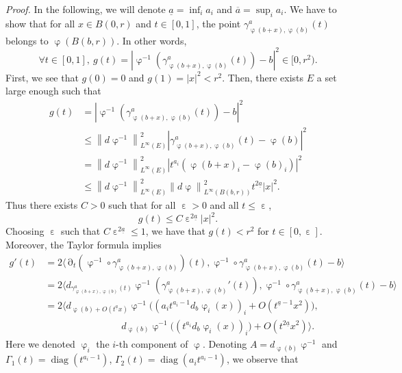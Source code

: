 \documentclass[12pt]{amsart}
\newcommand{\diag}{\operatorname{diag}}
\def\<{\langle}
\def\>{\rangle}
\newcommand{\bp}{{\it Proof. }}
\numberwithin{equation}{section}
\numberwithin{figure}{section}
\DeclareMathOperator{\p}{\partial}
\DeclareMathOperator{\eps}{\varepsilon}
\DeclareMathOperator{\phii}{\varphi}
\newcommand{\vvert}[1]{\left\lVert#1\right\rVert}
\begin{document}
\bp
In the following, we will denote $\underline a = \inf_ia_i$ and $\overline a = \sup_ia_i$. We have to show that for all $x\in B(0,r)$ and $t\in[0,1]$, the point $\gamma^a_{\phii(b+x),\phii(b)}(t)$ belongs to $\phii(B(b,r))$. In other words,
\begin{equation*}
\forall t\in[0,1],\ g(t) = |\phii^{-1}(\gamma^a_{\phii(b+x),\phii(b)}(t))-b|^2\in[0,r^2).
\end{equation*}
First, we see that $g(0) = 0$ and $g(1) = |x|^2 < r^2$. Then, there exists $E$ a set large enough such that
\begin{equation*}
\begin{aligned}
    g(t) &= |\phii^{-1}(\gamma^a_{\phii(b+x),\phii(b)}(t))-b|^2\\
    &\leq \vvert{d\phii^{-1}}_{L^\infty(E)}^2 |\gamma^a_{\phii(b+x),\phii(b)}(t)-\phii(b)|^2\\
    &= \vvert{d\phii^{-1}}_{L^\infty(E)}^2 |t^{a_i}(\phii(b+x)_i-\phii(b)_i)|^2\\
    &\leq \vvert{d\phii^{-1}}_{L^\infty(E)}^2\vvert{d\phii}_{L^\infty(B(b,r))}^2 t^{2\underline a}|x|^2.
\end{aligned}
\end{equation*}
Thus there exists $C>0$ such that for all $\eps>0$ and all $t\leq\eps$,
\begin{equation*}
g(t) \leq C\eps^{2\underline a}|x|^2.
\end{equation*}
Choosing $\eps$ such that $C\eps^{2\underline a} \leq 1$, we have that $g(t) < r^2$ for $t\in[0,\eps]$.
Moreover, the Taylor formula implies
\begin{equation*}
\begin{aligned}
    g'(t) &= 2\< \p_t(\phii^{-1}\circ\gamma^a_{\phii(b+x),\phii(b)})(t),\phii^{-1}\circ\gamma^a_{\phii(b+x),\phii(b)}(t) - b\>\\
    &= 2\< d_{\gamma^a_{\phii(b+x),\phii(b)}(t)}\phii^{-1}({\gamma^a_{\phii(b+x),\phii(b)}}'(t)),\phii^{-1}\circ\gamma^a_{\phii(b+x),\phii(b)}(t) - b\>\\
    &= 2\< d_{\phii(b)+O(t^{\underline a}x)}\phii^{-1}\big((a_it^{a_i-1}d_b\phii_i(x))_i + O(t^{\underline a-1}x^2)\big),\\&\phantom{************}d_{\phii(b)}\phii^{-1}\big((t^{a_i}d_b\phii_i(x))_i\big) + O(t^{2\underline a}x^2)\>.
\end{aligned}
\end{equation*}
Here we denoted $\phii_i$ the $i$-th component of $\phii$. Denoting $A = d_{\phii(b)}\phii^{-1}$ and $\Gamma_1(t) = \diag(t^{a_i-1})$, $\Gamma_2(t) = \diag(a_it^{a_i-1})$, we observe that
\end{document}
